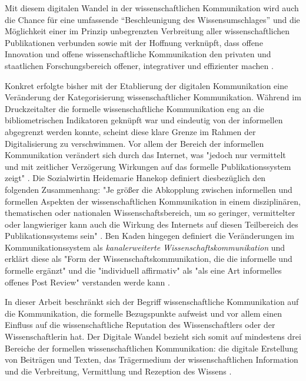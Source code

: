 Mit diesem digitalen Wandel in der wissenschaftlichen Kommunikation wird auch die Chance für eine umfassende “Beschleunigung des Wissensumschlages” \cite{Wenzel_2003} und die Möglichkeit einer im Prinzip unbegrenzten Verbreitung aller wissenschaftlichen Publikationen \cite{bbaw_publizieren_2015} verbunden sowie mit der Hoffnung verknüpft, dass offene Innovation und offene wissenschaftliche Kommunikation den privaten und staatlichen Forschungsbereich offener, integrativer und effizienter machen \cite{suchen}.

Konkret erfolgte bisher mit der Etablierung der digitalen Kommunikation eine Veränderung der Kategorisierung wissenschaftlicher Kommunikation. Während im Druckzeitalter die formelle wissenschaftliche Kommunikation eng an die bibliometrischen Indikatoren geknüpft war und eindeutig von der informellen abgegrenzt werden konnte, scheint diese klare Grenze im Rahmen der Digitalisierung zu verschwimmen. Vor allem der Bereich der informellen Kommunikation verändert sich durch das Internet, was "jedoch nur vermittelt und mit zeitlicher Verzögerung Wirkungen auf das formelle Publikationssystem zeigt" \cite{Hanekop_2014}. Die Sozialwirtin Heidemarie Hanekop definiert diesbezüglich den folgenden Zusammenhang: "Je größer die Abkopplung zwischen informellen und formellen Aspekten der wissenschaftlichen Kommunikation in einem disziplinären, thematischen oder nationalen Wissenschaftsbereich, um so geringer, vermittelter oder langwieriger kann auch die Wirkung des Internets auf diesen Teilbereich des Publikationssystems sein" \cite{Hanekop_2014}. Ben Kaden hingegen definiert die Veränderungen im Kommunikationssystem als \textit{kanalerweiterte Wissenschaftskommunikation} und erklärt diese als "Form der Wissenschaftskommunikation, die die informelle und formelle ergänzt" und die "individuell affirmativ" als "als eine Art informelles offenes Post Review" verstanden werde kann \cite{kaden_2009_library}.

In dieser Arbeit beschränkt sich der Begriff wissenschaftliche Kommunikation auf die Kommunikation, die formelle Bezugspunkte aufweist und vor allem einen Einfluss auf die wissenschaftliche Reputation des Wissenschaftlers oder der Wissenschaftlerin hat. Der Digitale Wandel bezieht sich somit auf mindestens drei Bereiche der formellen wissenschaftlichen Kommunikation: die digitale Erstellung von Beiträgen und Texten, das Trägermedium der wissenschaftlichen Information und die Verbreitung, Vermittlung und Rezeption des Wissens \cite{bbaw_publizieren_2015}.

